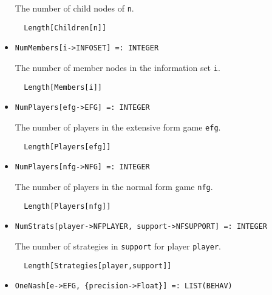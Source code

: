 \begin{itemize}
\bd 
The number of child nodes of \verb+n+.
\begin{verbatim}
  Length[Children[n]]
\end{verbatim} 
\ed

\item{}
\protect \large \begin{verbatim}
NumMembers[i->INFOSET] =: INTEGER 
\end{verbatim}\normalsize

\bd 
The number of member nodes in the information set \verb+i+.
\begin{verbatim}
  Length[Members[i]]
\end{verbatim} 
\ed

\item{}
\protect \large \begin{verbatim}
NumPlayers[efg->EFG] =: INTEGER 
\end{verbatim}\normalsize

\bd 
The number of players in the extensive form game \verb+efg+.
\begin{verbatim}
  Length[Players[efg]]
\end{verbatim} 
\ed

\item{}
\protect \large \begin{verbatim}
NumPlayers[nfg->NFG] =: INTEGER 
\end{verbatim}\normalsize

\bd 
The number of players in the normal form game \verb+nfg+.
\begin{verbatim}
  Length[Players[nfg]]
\end{verbatim} 
\ed

\item{}
\protect \large \begin{verbatim}
NumStrats[player->NFPLAYER, support->NFSUPPORT] =: INTEGER 
\end{verbatim}\normalsize

\bd 
The number of strategies in \verb+support+ for player \verb+player+.
\begin{verbatim}
  Length[Strategies[player,support]] 
\end{verbatim} 
\ed


\item{}
\protect \large \begin{verbatim}
OneNash[e->EFG, {precision->Float}] =: LIST(BEHAV) 
\end{verbatim}\normalsize


\end{itemize}
